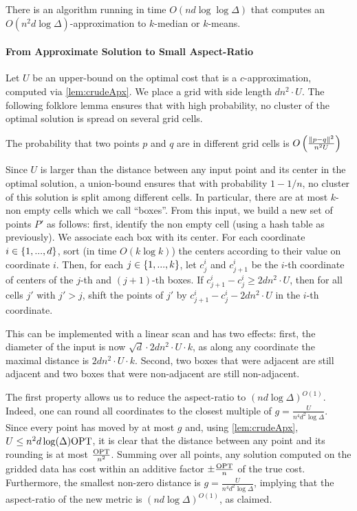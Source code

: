 \begin{lemma}\label{lem:crudeApx}
There is an algorithm running in time $O(nd \log \log \Delta)$ that computes an  $O(n^2 d \log \Delta)$-approximation to $k$-median or $k$-means.
\end{lemma}

\paragraph*{From Approximate Solution to Small Aspect-Ratio}
Let $U$ be an upper-bound on the optimal cost that is a $c$-approximation, computed via \cref{lem:crudeApx}. We place a grid with side length $d n^2\cdot U$.
The following folklore lemma ensures that with high probability, no cluster of the optimal solution is spread on several grid cells.

\begin{lemma}
The probability that two points $p$ and $q$ are in different grid cells is $O\left( \frac{\|p-q\|^2}{n^2 U}\right)$
\end{lemma}

Since $U$ is larger than the distance between any input point and its center in the optimal solution, a union-bound ensures that with probability $1-1/n$, no
cluster of this solution is split among different cells.  In particular, there are at most $k$-non empty cells which we call ``boxes''.
From this input, we build a new set of points $P'$ as follows: first, identify the non empty cell (using a hash table as previously). We associate each box with
its center.  For each coordinate $i \in \left\{ 1, ..., d \right\}$, sort (in time $O(k \log k)$) the centers according to their value on coordinate $i$. Then, for
each $j \in \left\{ 1, ..., k\right\}$, let $c^i_j$ and $c^i_{j+1}$ be the $i$-th coordinate of centers of the $j$-th and $(j+1)$-th boxes. If $c^i_{j+1} - c^i_j
\geq 2d n^2\cdot U$, then for all cells $j'$ with $j' > j$, shift the points of $j'$ by $c^i_{j+1} - c^i_j - 2d n^2\cdot U$ in the $i$-th coordinate.

This can be implemented with a linear scan and has two effects: first, the diameter of the input is now $\sqrt{d} \cdot 2d n^2\cdot U \cdot k$, as along any
coordinate the maximal distance is $2d n^2\cdot U \cdot k$. Second, two boxes that were adjacent are still adjacent and two boxes that were non-adjacent are
still non-adjacent.

The first property allows us to reduce the aspect-ratio to $(nd \log \Delta)^{O(1)}$.  Indeed, one can round all coordinates to the closest multiple of
$g = \frac{U}{n^4 d^{2} \log \Delta}$. Since every point has moved by at most $g$ and, using \cref{lem:crudeApx}, $U
\leq n^2 d \log(\Delta) \text{OPT}$, it is clear that the distance between any point and its rounding is at most $\frac{\text{OPT}}{n^2}$. Summing over all points,
any solution computed on the gridded data has cost within an additive factor $\pm \frac{\text{OPT}}{n}$ of the true cost. Furthermore, the smallest
non-zero distance is $g = \frac{U}{n^4 d^{2} \log \Delta}$, implying that the aspect-ratio of the new metric is $(nd \log \Delta)^{O(1)}$,
as claimed.


